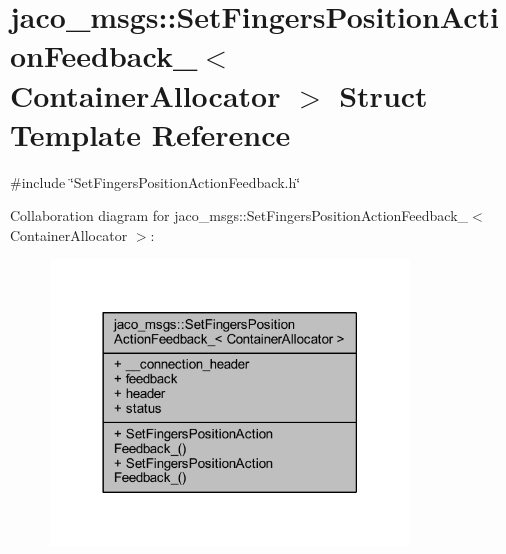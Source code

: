 \hypertarget{structjaco__msgs_1_1SetFingersPositionActionFeedback__}{}\section{jaco\+\_\+msgs\+:\+:Set\+Fingers\+Position\+Action\+Feedback\+\_\+$<$ Container\+Allocator $>$ Struct Template Reference}
\label{structjaco__msgs_1_1SetFingersPositionActionFeedback__}


{\ttfamily \#include \char`\"{}Set\+Fingers\+Position\+Action\+Feedback.\+h\char`\"{}}



Collaboration diagram for jaco\+\_\+msgs\+:\+:Set\+Fingers\+Position\+Action\+Feedback\+\_\+$<$ Container\+Allocator $>$\+:
\nopagebreak
\begin{figure}[H]
\begin{center}
\leavevmode
\includegraphics[width=270pt]{de/d2e/structjaco__msgs_1_1SetFingersPositionActionFeedback____coll__graph}
\end{center}
\end{figure}
